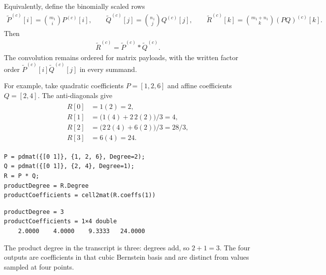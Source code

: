 Equivalently, define the binomially scaled rows
\begin{gather*}
  \widetilde P^{(c)}[i]=\binom{m_1}{i}P^{(c)}[i],
  \qquad
  \widetilde Q^{(c)}[j]=\binom{n_1}{j}Q^{(c)}[j],
  \qquad
  \widetilde R^{(c)}[k]=\binom{m_1+n_1}{k}(PQ)^{(c)}[k].
\end{gather*}
Then
\begin{gather*}
  \widetilde R^{(c)}
  =\widetilde P^{(c)}*\widetilde Q^{(c)}.
\end{gather*}
The convolution remains ordered for matrix payloads, with the written factor order $\widetilde P^{(c)}[i]\widetilde Q^{(c)}[j]$ in every summand.

For example, take quadratic coefficients $P=[1,2,6]$ and affine coefficients $Q=[2,4]$. The anti-diagonals give
\begin{gather*}
\begin{aligned}
  R[0]&=1(2)=2,\\
  R[1]&=\bigl(1(4)+2\,2(2)\bigr)/3=4,\\
  R[2]&=\bigl(2\,2(4)+6(2)\bigr)/3=28/3,\\
  R[3]&=6(4)=24.
\end{aligned}
\end{gather*}
\begin{lstlisting}[style=dpmatlab]
P = pdmat({[0 1]}, {1, 2, 6}, Degree=2);
Q = pdmat({[0 1]}, {2, 4}, Degree=1);
R = P * Q;
productDegree = R.Degree
productCoefficients = cell2mat(R.coeffs(1))
\end{lstlisting}

\begin{lstlisting}[style=dpoutput]
productDegree = 3
productCoefficients = 1×4 double
    2.0000    4.0000    9.3333   24.0000
\end{lstlisting}

The product degree in the transcript is three: degrees add, so $2+1=3$. The four outputs are coefficients in that cubic Bernstein basis and are distinct from values sampled at four points.

